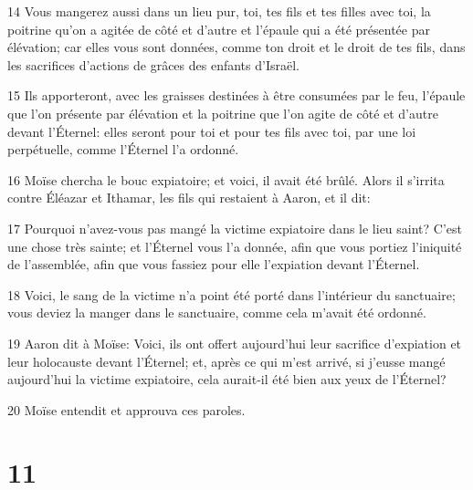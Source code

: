 \par 14 Vous mangerez aussi dans un lieu pur, toi, tes fils et tes filles avec toi, la poitrine qu'on a agitée de côté et d'autre et l'épaule qui a été présentée par élévation; car elles vous sont données, comme ton droit et le droit de tes fils, dans les sacrifices d'actions de grâces des enfants d'Israël.
\par 15 Ils apporteront, avec les graisses destinées à être consumées par le feu, l'épaule que l'on présente par élévation et la poitrine que l'on agite de côté et d'autre devant l'Éternel: elles seront pour toi et pour tes fils avec toi, par une loi perpétuelle, comme l'Éternel l'a ordonné.
\par 16 Moïse chercha le bouc expiatoire; et voici, il avait été brûlé. Alors il s'irrita contre Éléazar et Ithamar, les fils qui restaient à Aaron, et il dit:
\par 17 Pourquoi n'avez-vous pas mangé la victime expiatoire dans le lieu saint? C'est une chose très sainte; et l'Éternel vous l'a donnée, afin que vous portiez l'iniquité de l'assemblée, afin que vous fassiez pour elle l'expiation devant l'Éternel.
\par 18 Voici, le sang de la victime n'a point été porté dans l'intérieur du sanctuaire; vous deviez la manger dans le sanctuaire, comme cela m'avait été ordonné.
\par 19 Aaron dit à Moïse: Voici, ils ont offert aujourd'hui leur sacrifice d'expiation et leur holocauste devant l'Éternel; et, après ce qui m'est arrivé, si j'eusse mangé aujourd'hui la victime expiatoire, cela aurait-il été bien aux yeux de l'Éternel?
\par 20 Moïse entendit et approuva ces paroles.

\chapter{11}

